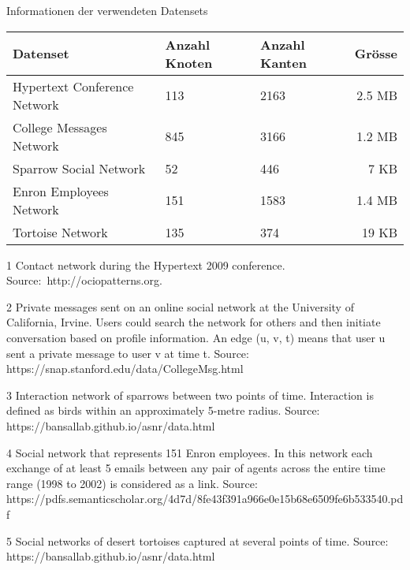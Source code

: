 \begin{threeparttable}
    \centering
    \label{dataset_info}
    \caption{Informationen der verwendeten Datensets}
    \begin{tabular}{@{}lllr@{}}
        \toprule
        Datenset                        & Anzahl Knoten & Anzahl Kanten & Grösse \\ \midrule
        Hypertext Conference Network\tnote{1}                 & 113     & 2163 & 2.5 MB   \\
        College Messages Network\tnote{2} & 845    & 3166 & 1.2 MB     \\
        Sparrow Social Network\tnote{3}                 & 52     & 446 & 7 KB   \\
        Enron Employees Network\tnote{4}                 & 151     & 1583 & 1.4 MB   \\
        Tortoise Network\tnote{5}                       & 135   & 374 & 19 KB   \\ \bottomrule
    \end{tabular}
    \begin{tablenotes}[\flushleft]
        \footnotesize
        \item[1] Contact network during the Hypertext 2009 conference. Source: http://ociopatterns.org.
        \item[2] Private messages sent on an online social network at the University of California, Irvine. Users could search the network for others and then initiate conversation based on profile information. An edge (u, v, t) means that user u sent a private message to user v at time t. Source: https://snap.stanford.edu/data/CollegeMsg.html
        \item[3] Interaction network of sparrows between two points of time. Interaction is defined as birds within an approximately 5-metre radius. Source: https://bansallab.github.io/asnr/data.html
        \item[4] Social network that represents 151 Enron employees. In this network each exchange of at least 5 emails between any pair of agents across the entire time range (1998 to 2002) is considered as a link. Source: https://pdfs.semanticscholar.org/4d7d/8fe43f391a966e0e15b68e6509fe6b533540.pdf
        \item[5] Social networks of desert tortoises captured at several points of time. Source: https://bansallab.github.io/asnr/data.html
    \end{tablenotes}
\end{threeparttable}

